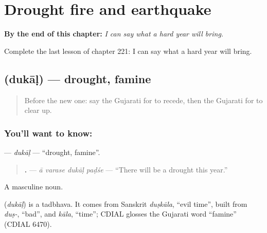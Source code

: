 
\chapter{Drought fire and earthquake}
\label{ch:gu-drought-fire-and-earthquake}

\begin{chapteropening}
\textbf{By the end of this chapter:} \emph{I can say what a hard year will bring.}

Complete the last lesson of chapter 221: I can say what a hard year will bring.
\end{chapteropening}

\section[\texorpdfstring{\gu{દુકાળ} (dukāḷ)}{દુકાળ (dukāḷ)}]{ (dukāḷ) — drought, famine}

\label{lesson:GU-C221-dukal}



\begin{quote}
Before the new one: say the Gujarati for to recede, then the Gujarati for to clear up.
\end{quote}

\subsection*{You'll want to know: }
\textbf{} — \emph{dukāḷ} — \textquotedblleft{}drought, famine\textquotedblright{}.

\begin{quote}
\textbf{   .} — \emph{ā varase dukāḷ paḍśe} — \textquotedblleft{}There will be a drought this year.\textquotedblright{}
\end{quote}

A masculine noun.

\begin{cousinweb}
\textbf{} (\emph{dukāḷ}) is a tadbhava. It comes from Sanskrit \emph{duṣkāla}, \textquotedblleft{}evil time\textquotedblright{}, built from \emph{duṣ-}, \textquotedblleft{}bad\textquotedblright{}, and \emph{kāla}, \textquotedblleft{}time\textquotedblright{}; CDIAL glosses the Gujarati word \textquotedblleft{}famine\textquotedblright{} (CDIAL 6470).
\end{cousinweb}

